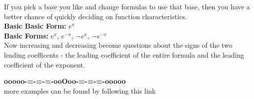 \documentclass{ximera}
\begin{document}
If you pick a base you like and change formulas to use that base, then you have a better chance of quickly deciding on function characteristics. \\



\textbf{\textcolor{blue!55!black}{Basic Basic Form:}}  $e^x$ \\



\textbf{\textcolor{blue!55!black}{Basic Forms:}}  $e^x$, $e^{-x}$, $-e^x$, $-e^{-x}$ \\


Now increasing and decreasing become questions about the signs of the two leading coefficents - the leading coefficient of the entire formula and the leading coefficient of the exponent.




\begin{center}
\textbf{\textcolor{green!50!black}{ooooo-=-=-=-ooOoo-=-=-=-ooooo}} \\

more examples can be found by following this link\\ 

\end{center}
\end{document}
